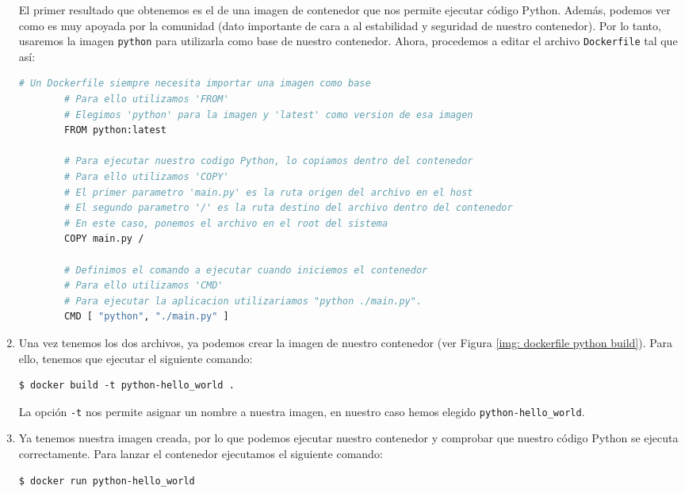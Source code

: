\documentclass[12pt]{article}
\begin{document}
\begin{enumerate}
	\noindent El primer resultado que obtenemos es el de una imagen de contenedor que nos permite ejecutar código Python. Además, podemos ver como es muy apoyada por la comunidad (dato importante de cara a al estabilidad y seguridad de nuestro contenedor). Por lo tanto, usaremos la imagen \texttt{python} para utilizarla como base de nuestro contenedor. Ahora, procedemos a editar el archivo \texttt{Dockerfile} tal que así:
	\begin{lstlisting}[language=bash, caption={Contenido del archivo Dockerfile para crear contenedor con código Python}]
		# Un Dockerfile siempre necesita importar una imagen como base
		# Para ello utilizamos 'FROM'
		# Elegimos 'python' para la imagen y 'latest' como version de esa imagen
		FROM python:latest
		
		# Para ejecutar nuestro codigo Python, lo copiamos dentro del contenedor
		# Para ello utilizamos 'COPY'
		# El primer parametro 'main.py' es la ruta origen del archivo en el host
		# El segundo parametro '/' es la ruta destino del archivo dentro del contenedor
		# En este caso, ponemos el archivo en el root del sistema
		COPY main.py /
		
		# Definimos el comando a ejecutar cuando iniciemos el contenedor
		# Para ello utilizamos 'CMD'
		# Para ejecutar la aplicacion utilizariamos "python ./main.py".
		CMD [ "python", "./main.py" ]
	\end{lstlisting}
	
	\pagebreak
	
	\item Una vez tenemos los dos archivos, ya podemos crear la imagen de nuestro contenedor (ver Figura \ref{img: dockerfile python build}). Para ello, tenemos que ejecutar el siguiente comando:
	\begin{verbatim}
$ docker build -t python-hello_world .
	\end{verbatim}

	\noindent La opción \texttt{-t} nos permite asignar un nombre a nuestra imagen, en nuestro caso hemos elegido \texttt{python-hello\_world}.
	
	\item Ya tenemos nuestra imagen creada, por lo que podemos ejecutar nuestro contenedor y comprobar que nuestro código Python se ejecuta correctamente. Para lanzar el contenedor ejecutamos el siguiente comando:
	\begin{verbatim}
$ docker run python-hello_world
	\end{verbatim}


\end{enumerate}
\end{document}
